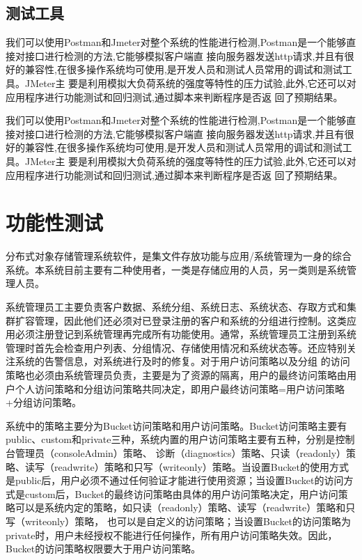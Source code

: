 \subsection{测试工具}


我们可以使用Postman和Jmeter对整个系统的性能进行检测,Postman是一个能够直接对接口进行检测的方法,它能够模拟客户端直
接向服务器发送http请求,并且有很好的兼容性,在很多操作系统均可使用,是开发人员和测试人员常用的调试和测试工具。JMeter主
要是利用模拟大负荷系统的强度等特性的压力试验,此外,它还可以对应用程序进行功能测试和回归测试,通过脚本来判断程序是否返
回了预期结果。

我们可以使用Postman和Jmeter对整个系统的性能进行检测,Postman是一个能够直接对接口进行检测的方法,它能够模拟客户端直
接向服务器发送http请求,并且有很好的兼容性,在很多操作系统均可使用,是开发人员和测试人员常用的调试和测试工具。JMeter主
要是利用模拟大负荷系统的强度等特性的压力试验,此外,它还可以对应用程序进行功能测试和回归测试,通过脚本来判断程序是否返
回了预期结果。






\section{功能性测试}

分布式对象存储管理系统软件，是集文件存放功能与应用/系统管理为一身的综合系统。本系统目前主要有二种使用者，一类是存储应用的人员，另一类则是系统管理人员。


系统管理员工主要负责客户数据、系统分组、系统日志、系统状态、存取方式和集群扩容管理，因此他们还必须对已登录注册的客户和系统的分组进行控制。这类应用必须注册登记到系统管理再完成所有功能使用。通常，系统管理员工注册到系统管理时首先会检查用户列表、分组情况、存储使用情况和系统状态等。还应特别关注系统的告警信息，对系统进行及时的修复。对于用户访问策略以及分组
的访问策略也必须由系统管理员负责，主要是为了资源的隔离，用户的最终访问策略由用户个人访问策略和分组访问策略共同决定，即用户最终访问策略=用户访问策略+分组访问策略。

系统中的策略主要分为Bucket访问策略和用户访问策略。Bucket访问策略主要有public、custom和private三种，系统内置的用户访问策略主要有五种，分别是控制台管理员（consoleAdmin）策略、
诊断（diagnostics）策略、只读（readonly）策略、读写（readwrite）策略和只写（writeonly）策略。当设置Bucket的使用方式是public后，用户必须不通过任何验证才能进行使用资源；当设置Bucket的访问方式是custom后，Bucket的最终访问策略由具体的用户访问策略决定，用户访问策略可以是系统内定的策略，如只读（readonly）策略、读写（readwrite）策略和只写（writeonly）策略，
也可以是自定义的访问策略；当设置Bucket的访问策略为private时，用户未经授权不能进行任何操作，所有用户访问策略失效。因此，Bucket的访问策略权限要大于用户访问策略。

